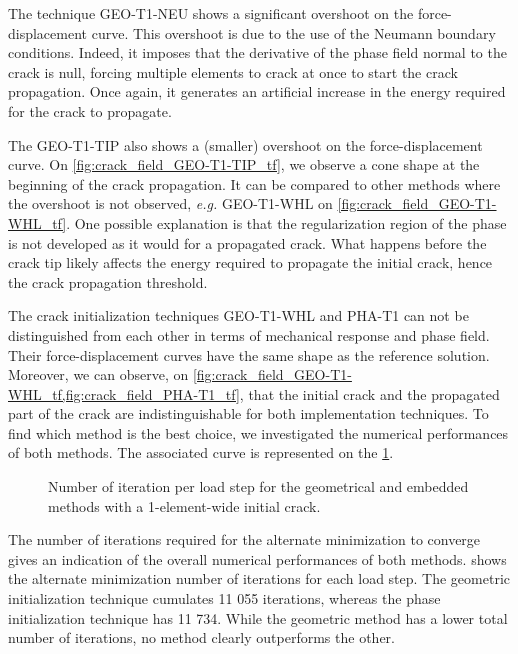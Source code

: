 \documentclass[OptSoft]{jtcam_preprint}
\begin{document}
The technique GEO-T1-NEU shows a significant overshoot on the force-displacement curve.
This overshoot is due to the use of the Neumann boundary conditions.
Indeed, it imposes that the derivative of the phase field normal to the crack is null, forcing multiple elements to crack at once to start the crack propagation.
Once again, it generates an artificial increase in the energy required for the crack to propagate.

The GEO-T1-TIP also shows a (smaller) overshoot on the force-displacement curve.
On \cref{fig:crack_field_GEO-T1-TIP_tf}, we observe a cone shape at the beginning of the crack propagation.
It can be compared to other methods where the overshoot is not observed, \emph{e.g.} GEO-T1-WHL on \cref{fig:crack_field_GEO-T1-WHL_tf}.
One possible explanation is that the regularization region of the phase is not developed as it would for a propagated crack.
What happens before the crack tip likely affects the energy required to propagate the initial crack, hence the crack propagation threshold.

The crack initialization techniques GEO-T1-WHL and PHA-T1 can not be distinguished from each other in terms of mechanical response and phase field.
Their force-displacement curves have the same shape as the reference solution.
Moreover, we can observe, on \cref{fig:crack_field_GEO-T1-WHL_tf,fig:crack_field_PHA-T1_tf}, that the initial crack and the propagated part of the crack are indistinguishable for both implementation techniques.
To find which method is the best choice, we investigated the numerical performances of both methods.
The associated curve is represented on the \cref{fig:initial_crack_N_iter}.
\begin{figure}
  \centering
  
  \caption{Number of iteration per load step for the geometrical and embedded methods with a 1-element-wide initial crack.}
  \label{fig:initial_crack_N_iter}
\end{figure}
The number of iterations required for the alternate minimization to converge gives an indication of the overall numerical performances of both methods.
 shows the alternate minimization number of iterations for each load step.
The geometric initialization technique cumulates 11 055 iterations, whereas the phase initialization technique has 11 734.
While the geometric method has a lower total number of iterations, no method clearly outperforms the other.
\end{document}
